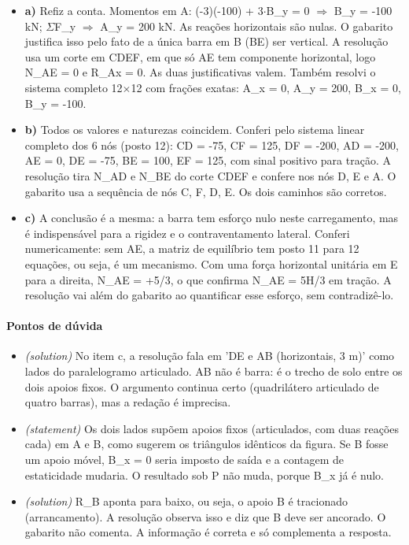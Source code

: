 \documentclass{article}%
\begin{document}
\begin{itemize}%
\item%
\textbf{a)} Refiz a conta. Momentos em A: (-3)(-100) + 3$\cdot$B\_y = 0 $\Rightarrow$ B\_y = -100 kN; $\Sigma$F\_y $\Rightarrow$ A\_y = 200 kN. As reações horizontais são nulas. O gabarito justifica isso pelo fato de a única barra em B (BE) ser vertical. A resolução usa um corte em CDEF, em que só AE tem componente horizontal, logo N\_AE = 0 e R\_Ax = 0. As duas justificativas valem. Também resolvi o sistema completo 12$\times$12 com frações exatas: A\_x = 0, A\_y = 200, B\_x = 0, B\_y = -100.%
\item%
\textbf{b)} Todos os valores e naturezas coincidem. Conferi pelo sistema linear completo dos 6 nós (posto 12): CD = -75, CF = 125, DF = -200, AD = -200, AE = 0, DE = -75, BE = 100, EF = 125, com sinal positivo para tração. A resolução tira N\_AD e N\_BE do corte CDEF e confere nos nós D, E e A. O gabarito usa a sequência de nós C, F, D, E. Os dois caminhos são corretos.%
\item%
\textbf{c)} A conclusão é a mesma: a barra tem esforço nulo neste carregamento, mas é indispensável para a rigidez e o contraventamento lateral. Conferi numericamente: sem AE, a matriz de equilíbrio tem posto 11 para 12 equações, ou seja, é um mecanismo. Com uma força horizontal unitária em E para a direita, N\_AE = +5/3, o que confirma N\_AE = 5H/3 em tração. A resolução vai além do gabarito ao quantificar esse esforço, sem contradizê{-}lo.%
\end{itemize}%
\paragraph{Pontos de dúvida}%
\begin{itemize}%
\item%
\textit{(solution)} No item c, a resolução fala em 'DE e AB (horizontais, 3 m)' como lados do paralelogramo articulado. AB não é barra: é o trecho de solo entre os dois apoios fixos. O argumento continua certo (quadrilátero articulado de quatro barras), mas a redação é imprecisa.%
\item%
\textit{(statement)} Os dois lados supõem apoios fixos (articulados, com duas reações cada) em A e B, como sugerem os triângulos idênticos da figura. Se B fosse um apoio móvel, B\_x = 0 seria imposto de saída e a contagem de estaticidade mudaria. O resultado sob P não muda, porque B\_x já é nulo.%
\item%
\textit{(solution)} R\_B aponta para baixo, ou seja, o apoio B é tracionado (arrancamento). A resolução observa isso e diz que B deve ser ancorado. O gabarito não comenta. A informação é correta e só complementa a resposta.%
\end{itemize}%
\end{document}
